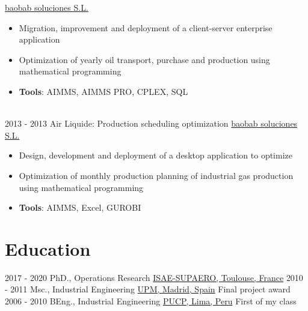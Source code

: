 \documentclass[letterpaper]{twentysecondcv} %
\begin{document}
\begin{twenty}
        {\href{https://baobabsoluciones.es/en/}{baobab soluciones S.L.}}
        {}
        {
        {\begin{itemize}
        \item Migration, improvement and deployment of a client-server enterprise application
        \item Optimization of yearly oil transport, purchase and production using mathematical programming
        \item \textbf{Tools}: AIMMS, AIMMS PRO, CPLEX, SQL
        \vspace{2mm}
    \end{itemize}}
        }
  \\
  \twentyitem
      {2013 - 2013 }
    {}
        {Air Liquide: Production scheduling optimization}
        {\href{https://baobabsoluciones.es/en/}{baobab soluciones S.L.}}
        {}
        {
        {\begin{itemize}
        \item Design, development and deployment of a desktop application to optimize
        \item Optimization of monthly production planning of industrial gas production using mathematical programming
        \item \textbf{Tools}: AIMMS, Excel, GUROBI
        \vspace{2mm}
    \end{itemize}}
        }
\end{twenty}
\vspace{-0.5cm}
\section{Education}

\begin{twenty} %
  \twentyitemshorttest
      {2017 - 2020}
        {}
        {PhD., Operations Research}
        {\href{https://www.isae-supaero.fr/en/}{ISAE-SUPAERO, Toulouse, France}}
        {}   
  \twentyitemshorttest
      {2010 - 2011}
    {}
        {Msc., Industrial Engineering}
        {\href{https://www.upm.es/internacional}{UPM, Madrid, Spain}}
        {Final project award}
  \twentyitemshorttest
      {2006 - 2010}
    {}
        {BEng., Industrial Engineering}
        {\href{https://www.pucp.edu.pe/}{PUCP, Lima, Peru}}
        {First of my class}
\end{twenty}
\end{document}
